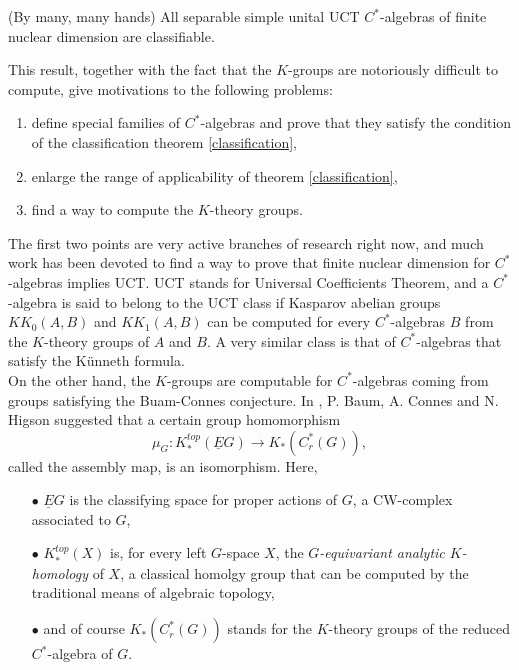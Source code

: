 \begin{theorem}\label{classification}(By many, many hands) All separable simple unital UCT $C^*$-algebras of finite nuclear dimension are classifiable.
\end{theorem}

This result, together with the fact that the $K$-groups are notoriously difficult to compute, give motivations to the following problems:
\begin{enumerate}
\item define special families of $C^*$-algebras and prove that they satisfy the condition of the classification theorem \ref{classification},
\item enlarge the range of applicability of theorem \ref{classification},
\item find a way to compute the $K$-theory groups.
\end{enumerate}    

The first two points are very active branches of research right now, and much work has been devoted to find a way to prove that finite nuclear dimension for $C^*$-algebras implies UCT. UCT stands for Universal Coefficients Theorem, and a $C^*$-algebra is said to belong to the UCT class if Kasparov abelian groups $KK_0(A,B)$ and $KK_1(A,B)$ can be computed for every $C^*$-algebras $B$ from the $K$-theory groups of $A$ and $B$. A very similar class is that of $C^*$-algebras that satisfy the K\"unneth formula. \\

On the other hand, the $K$-groups are computable for $C^*$-algebras coming from groups satisfying the Buam-Connes conjecture. In \cite{BCH84}, P. Baum, A. Connes and N. Higson suggested that a certain group homomorphism
\[\mu_G : K_*^{top}(\underline E G) \rightarrow K_*(C_r^*(G)), \]
called the assembly map, is an isomorphism. Here, 
\begin{itemize}
\item[$\bullet$] $\underline E G$ is the classifying space for proper actions of $G$, a CW-complex associated to $G$,
\item[$\bullet$] $K_*^{top}(X)$ is, for every left $G$-space $X$, the \textit{$G$-equivariant analytic $K$-homology} of $X$, a classical homolgy group that can be computed by the traditional means of algebraic topology,
\item[$\bullet$] and of course $K_*(C_r^*(G))$ stands for the $K$-theory groups of the reduced $C^*$-algebra of $G$. 
\end{itemize}

